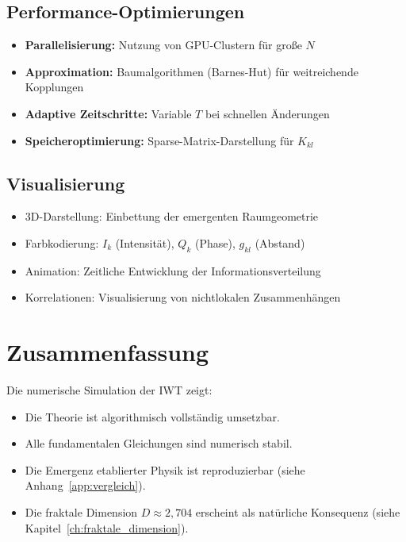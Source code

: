 \subsection{Performance-Optimierungen}
\label{sub:numerik_performance}

\begin{itemize}
    \item \textbf{Parallelisierung:} Nutzung von GPU-Clustern für gro{\ss}e \( N \)
    \item \textbf{Approximation:} Baumalgorithmen (Barnes-Hut) für weitreichende Kopplungen
    \item \textbf{Adaptive Zeitschritte:} Variable \( T \) bei schnellen Änderungen
    \item \textbf{Speicheroptimierung:} Sparse-Matrix-Darstellung für \( K_{kl} \)
\end{itemize}

\subsection{Visualisierung}
\label{sub:numerik_visualisierung}

\begin{itemize}
    \item 3D-Darstellung: Einbettung der emergenten Raumgeometrie
    \item Farbkodierung: \( I_k \) (Intensität), \( Q_k \) (Phase), \( g_{kl} \) (Abstand)
    \item Animation: Zeitliche Entwicklung der Informationsverteilung
    \item Korrelationen: Visualisierung von nichtlokalen Zusammenhängen
\end{itemize}

\section{Zusammenfassung}
\label{app:numerik_zusammenfassung}

Die numerische Simulation der IWT zeigt:

\begin{itemize}
    \item Die Theorie ist algorithmisch vollständig umsetzbar.
    \item Alle fundamentalen Gleichungen sind numerisch stabil.
    \item Die Emergenz etablierter Physik ist reproduzierbar (siehe Anhang~\ref{app:vergleich}).
    \item Die fraktale Dimension \( D \approx 2,704 \) erscheint als natürliche Konsequenz (siehe Kapitel~\ref{ch:fraktale_dimension}).
\end{itemize}

